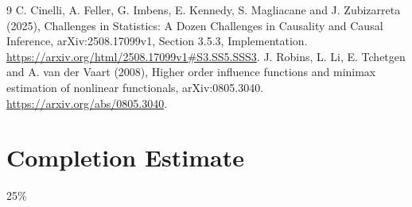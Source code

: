 \documentclass[11pt]{article}
\theoremstyle{remark}
\begin{document}
\begin{thebibliography}{9}
 C. Cinelli, A. Feller, G. Imbens, E. Kennedy,
S. Magliacane and J. Zubizarreta (2025), Challenges in Statistics:
A Dozen Challenges in Causality and Causal Inference,
arXiv:2508.17099v1, Section 3.5.3, Implementation.
\url{https://arxiv.org/html/2508.17099v1#S3.SS5.SSS3}.
 J. Robins, L. Li, E. Tchetgen and A. van der Vaart (2008),
Higher order influence functions and minimax estimation of nonlinear
functionals, arXiv:0805.3040. \url{https://arxiv.org/abs/0805.3040}.
\end{thebibliography}

\section{Completion Estimate}
25\%
\end{document}

